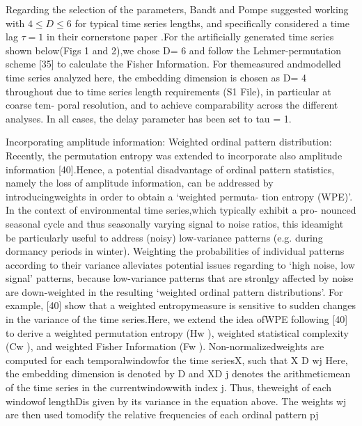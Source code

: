 Regarding the selection of the parameters, Bandt and Pompe suggested working with $4 \leq D \leq 6$ for typical time series lengths, and specifically considered a time lag $\tau = 1$ in their cornerstone paper \cite{Bandt2002}.For the artificially generated time series shown below(Figs 1 and 2),we chose D= 6 and follow the Lehmer-permutation scheme [35] to calculate the Fisher Information. For themeasured andmodelled time series analyzed here, the embedding dimension is chosen as D= 4 throughout due to time series length requirements (S1 File), in particular at coarse tem- poral resolution, and to achieve comparability across the different analyses. In all cases, the delay parameter has been set to tau = 1.

Incorporating amplitude information: Weighted ordinal pattern distribution:
Recently, the permutation entropy was extended to incorporate also amplitude information [40].Hence, a potential disadvantage of ordinal pattern statistics, namely the loss of amplitude information, can be addressed by introducingweights in order to obtain a ‘weighted permuta- tion entropy (WPE)’. In the context of environmental time series,which typically exhibit a pro- nounced seasonal cycle and thus seasonally varying signal to noise ratios, this ideamight be particularly useful to address (noisy) low-variance patterns (e.g. during dormancy periods in winter). Weighting the probabilities of individual patterns according to their variance alleviates
potential issues regarding to ‘high noise, low signal’ patterns, because low-variance patterns that are stronlgy affected by noise are down-weighted in the resulting ‘weighted ordinal pattern distributions’. For example, [40] show that a weighted entropymeasure is sensitive to sudden changes in the variance of the time series.Here, we extend the idea ofWPE following [40] to derive a weighted permutation entropy (Hw
), weighted statistical complexity (Cw ), and
weighted Fisher Information (Fw
).
Non-normalizedweights are computed for each temporalwindowfor the time seriesX, such that
X
D wj Here, the embedding dimension is denoted by D and XD j denotes the arithmeticmean of the
time series in the currentwindowwith index j. Thus, theweight of each windowof lengthDis given by its variance in the equation above. The weights wj are then used tomodify the relative frequencies of each ordinal pattern pj

